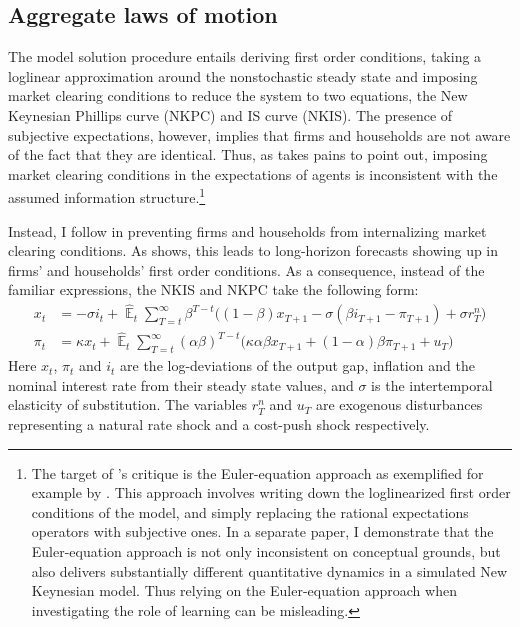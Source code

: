 \documentclass[11pt]{article}
\renewcommand{\[}{\begin{equation}}
\renewcommand{\]}{\end{equation}}
\DeclareMathOperator{\E}{\mathbb{E}}
\begin{document}
\subsection{Aggregate laws of motion}\label{FOCs}
The model solution procedure entails deriving first order conditions, taking a loglinear approximation around the nonstochastic steady state and imposing market clearing conditions to reduce the system to two equations, the New Keynesian Phillips curve (NKPC) and IS curve (NKIS). The presence of subjective expectations, however, implies that firms and households are not aware of the fact that they are identical. Thus, as \cite{preston2005} takes pains to point out, imposing market clearing conditions in the expectations of agents is inconsistent with the assumed information structure.\footnote{The target of \cite{preston2005}'s critique is the Euler-equation approach as exemplified for example by \cite{bullard2002learning}. This approach involves writing down the loglinearized first order conditions of the model, and simply replacing the rational expectations operators with subjective ones. In a separate paper, I demonstrate that the Euler-equation approach is not only inconsistent on conceptual grounds, but also delivers substantially different quantitative dynamics in a simulated New Keynesian model. Thus relying on the Euler-equation approach when investigating the role of learning can be misleading.} 

Instead, I follow \cite{preston2005} in preventing firms and households from internalizing market clearing conditions. As \cite{preston2005} shows, this leads to long-horizon forecasts showing up in firms' and households' first order conditions. As a consequence, instead of the familiar expressions, the NKIS and NKPC take the following form:
 \begin{align}
x_t &=  -\sigma i_t +\hat{\E}_t \sum_{T=t}^{\infty} \beta^{T-t }\big( (1-\beta)x_{T+1} - \sigma(\beta i_{T+1} - \pi_{T+1}) +\sigma r_T^n \big)  \label{NKIS}  \\
\pi_t &= \kappa x_t +\hat{\E}_t \sum_{T=t}^{\infty} (\alpha\beta)^{T-t }\big( \kappa \alpha \beta x_{T+1} + (1-\alpha)\beta \pi_{T+1} + u_T\big) \label{NKPC} 
\end{align}
Here $x_t$, $\pi_t$ and $i_t$ are the log-deviations of the output gap, inflation and the nominal interest rate from their steady state values, and $\sigma$ is the intertemporal elasticity of substitution. The variables $r_T^n$ and $u_T$ are exogenous disturbances representing a natural rate shock and a cost-push shock respectively. 
\end{document}
